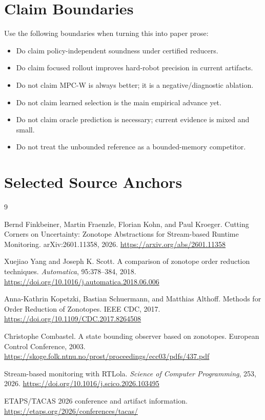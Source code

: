 \documentclass[11pt]{article}
\newcommand{\mpcw}{\textsc{MPC-W}}
\begin{document}
\section{Claim Boundaries}

Use the following boundaries when turning this into paper prose:

\begin{itemize}
\item Do claim policy-independent soundness under certified reducers.
\item Do claim focused rollout improves hard-robot precision in current
artifacts.
\item Do not claim \mpcw{} is always better; it is a negative/diagnostic
ablation.
\item Do not claim learned selection is the main empirical advance yet.
\item Do not claim oracle prediction is necessary; current evidence is mixed
and small.
\item Do not treat the unbounded reference as a bounded-memory competitor.
\end{itemize}

\section{Selected Source Anchors}

\begin{thebibliography}{9}

Bernd Finkbeiner, Martin Fraenzle, Florian Kohn, and Paul Kroeger.
\newblock Cutting Corners on Uncertainty: Zonotope Abstractions for
Stream-based Runtime Monitoring.
\newblock arXiv:2601.11358, 2026.
\newblock \url{https://arxiv.org/abs/2601.11358}

Xuejiao Yang and Joseph K. Scott.
\newblock A comparison of zonotope order reduction techniques.
\newblock \emph{Automatica}, 95:378--384, 2018.
\newblock \url{https://doi.org/10.1016/j.automatica.2018.06.006}

Anna-Kathrin Kopetzki, Bastian Schuermann, and Matthias Althoff.
\newblock Methods for Order Reduction of Zonotopes.
\newblock IEEE CDC, 2017.
\newblock \url{https://doi.org/10.1109/CDC.2017.8264508}

Christophe Combastel.
\newblock A state bounding observer based on zonotopes.
\newblock European Control Conference, 2003.
\newblock \url{https://skoge.folk.ntnu.no/prost/proceedings/ecc03/pdfs/437.pdf}

Stream-based monitoring with RTLola.
\newblock \emph{Science of Computer Programming}, 253, 2026.
\newblock \url{https://doi.org/10.1016/j.scico.2026.103495}

ETAPS/TACAS 2026 conference and artifact information.
\newblock \url{https://etaps.org/2026/conferences/tacas/}

\end{thebibliography}
\end{document}
